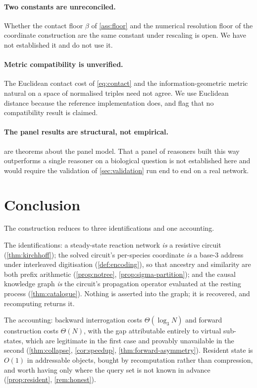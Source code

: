\documentclass[11pt,twocolumn,a4paper]{article}
\theoremstyle{plain}
\theoremstyle{definition}
\theoremstyle{remark}
\begin{document}
\paragraph{Two constants are unreconciled.}
Whether the contact floor $\beta$ of \cref{ass:floor} and the numerical
resolution floor of the coordinate construction are the same constant under
rescaling is open. We have not established it and do not use it.

\paragraph{Metric compatibility is unverified.}
The Euclidean contact cost of \cref{eq:contact} and the information-geometric
metric natural on a space of normalised triples \citep{Amari2016} need not agree.
We use Euclidean distance because the reference implementation does, and flag
that no compatibility result is claimed.

\paragraph{The panel results are structural, not empirical.}
 are theorems about the panel
model. That a panel of reasoners built this way outperforms a single reasoner on
a biological question is not established here and would require the validation
of \cref{sec:validation} run end to end on a real network.

\section{Conclusion}

The construction reduces to three identifications and one accounting.

The identifications: a steady-state reaction network \emph{is} a resistive
circuit (\cref{thm:kirchhoff}); the solved circuit's per-species coordinate
\emph{is} a base-3 address under interleaved digitisation
(\cref{def:encoding}), so that ancestry and similarity are both prefix
arithmetic (\cref{prop:notree}, \cref{prop:sigma-partition}); and the causal
knowledge graph \emph{is} the circuit's propagation operator evaluated at the
resting process (\cref{thm:catalogue}). Nothing is asserted into the graph;
it is recovered, and recomputing returns it.

The accounting: backward interrogation costs $\Theta(\log_3 N)$ and forward
construction costs $\Theta(N)$, with the gap attributable entirely to virtual
sub-states, which are legitimate in the first case and provably unavailable in
the second (\cref{thm:collapse}, \cref{cor:speedup},
\cref{thm:forward-asymmetry}). Resident state is $O(1)$ in addressable objects,
bought by recomputation rather than compression, and worth having only where the
query set is not known in advance (\cref{prop:resident},
\cref{rem:honest}).
\end{document}
